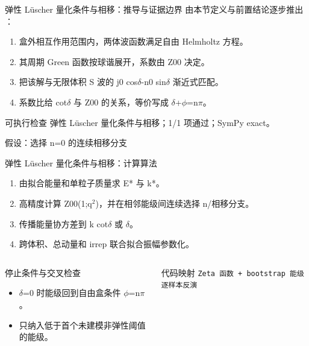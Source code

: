 \begin{frame}[t]{弹性 Lüscher 量化条件与相移：推导与证据边界}
\footnotesize
{}\quad 由本节定义与前置结论逐步推出 ：
\begin{enumerate}
\item 盒外相互作用范围内，两体波函数满足自由 Helmholtz 方程。
\item 其周期 Green 函数按球谐展开，系数由 Z00 决定。
\item 把该解与无限体积 S 波的 j0 cos\ensuremath{\delta}-n0 sin\ensuremath{\delta} 渐近式匹配。
\item 系数比给 cot\ensuremath{\delta} 与 Z00 的关系，等价写成 \ensuremath{\delta}+\ensuremath{\phi}=n\ensuremath{\pi}。
\end{enumerate}\begin{block}{可执行检查}
\quad 弹性 Lüscher 量化条件与相移；1/1 项通过；SymPy exact。
\par\scriptsize 假设：选择 n=0 的连续相移分支
\end{block}
\end{frame}

\begin{frame}[t]{弹性 Lüscher 量化条件与相移：计算算法}
\footnotesize
{}\begin{enumerate}
\item 由拟合能量和单粒子质量求 E* 与 k*。
\item 高精度计算 Z00(1;q\ensuremath{^{2}})，并在相邻能级间连续选择 n/\allowbreak{}相移分支。
\item 传播能量协方差到 k cot\ensuremath{\delta} 或 \ensuremath{\delta}。
\item 跨体积、总动量和 irrep 联合拟合振幅参数化。
\end{enumerate}\begin{columns}[T,onlytextwidth]
\begin{block}{停止条件与交叉检查}\scriptsize\begin{itemize}
\item[\CheckMark] \ensuremath{\delta}=0 时能级回到自由盒条件 \ensuremath{\phi}=n\ensuremath{\pi}。
\item[\CheckMark] 只纳入低于首个未建模非弹性阈值的能级。
\end{itemize}\end{block}
\begin{block}{代码映射}
\scriptsize \texttt{Zeta 函数 + bootstrap 能级逐样本反演}
\end{block}\end{columns}\end{frame}

